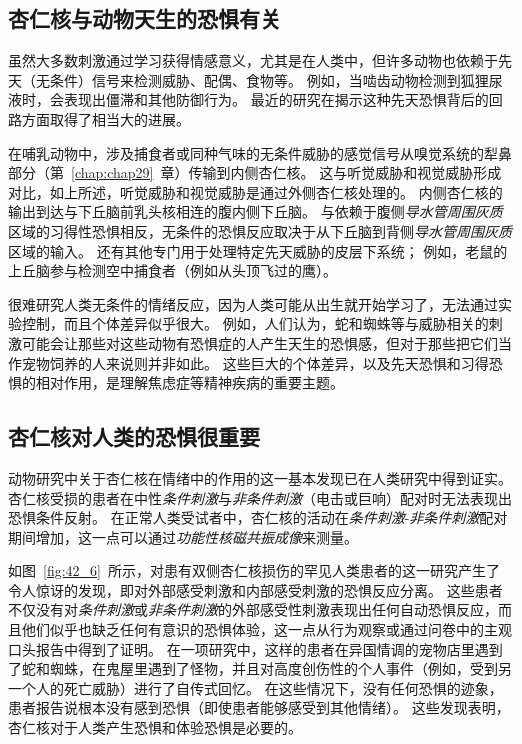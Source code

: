\subsection{杏仁核与动物天生的恐惧有关}

虽然大多数刺激通过学习获得情感意义，尤其是在人类中，但许多动物也依赖于先天（无条件）信号来检测威胁、配偶、食物等。
例如，当啮齿动物检测到狐狸尿液时，会表现出僵滞和其他防御行为。
最近的研究在揭示这种先天恐惧背后的回路方面取得了相当大的进展。


在哺乳动物中，涉及捕食者或同种气味的无条件威胁的感觉信号从嗅觉系统的犁鼻部分（第~\ref{chap:chap29}~章）传输到内侧杏仁核。
这与听觉威胁和视觉威胁形成对比，如上所述，听觉威胁和视觉威胁是通过外侧杏仁核处理的。
内侧杏仁核的输出到达与下丘脑前乳头核相连的腹内侧下丘脑。
与依赖于腹侧\textit{导水管周围灰质}区域的习得性恐惧相反，无条件的恐惧反应取决于从下丘脑到背侧\textit{导水管周围灰质}区域的输入。
还有其他专门用于处理特定先天威胁的皮层下系统；
例如，老鼠的上丘脑参与检测空中捕食者（例如从头顶飞过的鹰）。


很难研究人类无条件的情绪反应，因为人类可能从出生就开始学习了，无法通过实验控制，而且个体差异似乎很大。
例如，人们认为，蛇和蜘蛛等与威胁相关的刺激可能会让那些对这些动物有恐惧症的人产生天生的恐惧感，但对于那些把它们当作宠物饲养的人来说则并非如此。
这些巨大的个体差异，以及先天恐惧和习得恐惧的相对作用，是理解焦虑症等精神疾病的重要主题。



\subsection{杏仁核对人类的恐惧很重要}

动物研究中关于杏仁核在情绪中的作用的这一基本发现已在人类研究中得到证实。
杏仁核受损的患者在中性\textit{条件刺激}与\textit{非条件刺激}（电击或巨响）配对时无法表现出恐惧条件反射。
在正常人类受试者中，杏仁核的活动在\textit{条件刺激}-\textit{非条件刺激}配对期间增加，这一点可以通过\textit{功能性核磁共振成像}来测量。


如图~\ref{fig:42_6}~所示，对患有双侧杏仁核损伤的罕见人类患者的这一研究产生了令人惊讶的发现，即对外部感受刺激和内部感受刺激的恐惧反应分离。
这些患者不仅没有对\textit{条件刺激}或\textit{非条件刺激}的外部感受性刺激表现出任何自动恐惧反应，而且他们似乎也缺乏任何有意识的恐惧体验，这一点从行为观察或通过问卷中的主观口头报告中得到了证明。
在一项研究中，这样的患者在异国情调的宠物店里遇到了蛇和蜘蛛，在鬼屋里遇到了怪物，并且对高度创伤性的个人事件（例如，受到另一个人的死亡威胁）进行了自传式回忆。
在这些情况下，没有任何恐惧的迹象，患者报告说根本没有感到恐惧（即使患者能够感受到其他情绪）。
这些发现表明，杏仁核对于人类产生恐惧和体验恐惧是必要的。



